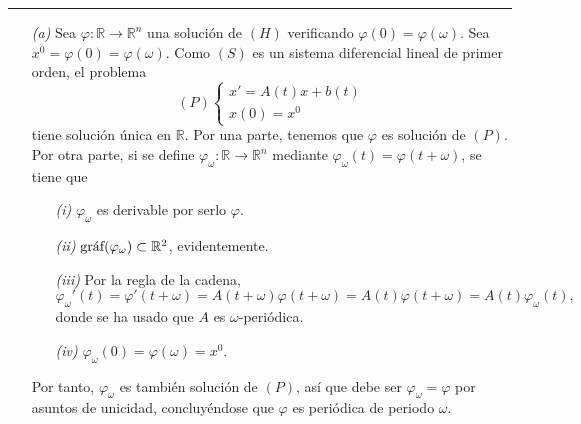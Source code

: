 \documentclass[11pt]{report}
\newcommand{\R}{\mathbb R}
\begin{document}
\vspace{2mm}

\hrule

\vspace{2mm}

\begin{itemize}
    \item[\textit{(a)}] Sea $\varphi \colon \R \to \R^n$ una solución de $(H)$ verificando $\varphi(0)=\varphi(\omega)$. Sea $x^0=\varphi(0)=\varphi(\omega)$. Como $(S)$ es un sistema diferencial lineal de primer orden, el problema
    \[(P) \begin{cases}
        x'=A(t)x+b(t) \\
        x(0)=x^0
    \end{cases}\]
    tiene solución única en $\R$. Por una parte, tenemos que $\varphi$ es solución de $(P)$. Por otra parte, si se define $\varphi_\omega \colon \R \to \R^n$ mediante $\varphi_\omega(t) = \varphi(t+\omega)$, se tiene que
    \begin{itemize}
        \item[\textit{(i)}] $\varphi_\omega$ es derivable por serlo $\varphi$.
        \item[\textit{(ii)}] $\textup{gráf}(\varphi_{\omega}) \subset \R^2$, evidentemente.
        \item[\textit{(iii)}] Por la regla de la cadena, \[\varphi_\omega'(t) = \varphi'(t+\omega)=A(t+\omega)\varphi(t+\omega)=A(t)\varphi(t+\omega)=A(t)\varphi_\omega(t),\] donde se ha usado que $A$ es $\omega$-periódica.
        \item[\textit{(iv)}] $\varphi_\omega(0) = \varphi(\omega)=x^0$.
    \end{itemize}
    Por tanto, $\varphi_\omega$ es también solución de $(P)$, así que debe ser $\varphi_\omega = \varphi$ por asuntos de unicidad, concluyéndose que $\varphi$ es periódica de periodo $\omega$.

    \vspace{2mm}


\end{itemize}
\end{document}
